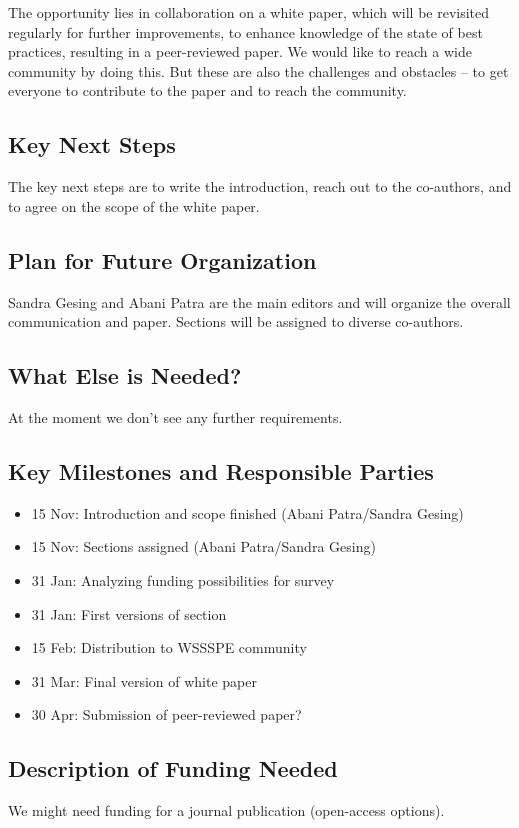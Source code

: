 The opportunity lies in collaboration on a white paper, which will be revisited
regularly for further improvements, to enhance knowledge of the state of best
practices, resulting in a peer-reviewed paper. We would like to reach a wide
community by doing this. But these are also the challenges and obstacles -- to
get everyone to contribute to the paper and to reach the community.

\subsection{Key Next Steps}

The key next steps are to write the introduction, reach out to the co-authors,
and to agree on the scope of the white paper.

\subsection{Plan for Future Organization}

Sandra Gesing and Abani Patra are the main editors and will organize the overall
communication and paper. Sections will be assigned to diverse co-authors.

\subsection{What Else is Needed?}

At the moment we don't see any further requirements.

\subsection{Key Milestones and Responsible Parties}
\begin{itemize}
\item 15 Nov: Introduction and scope finished (Abani Patra/Sandra Gesing)
\item 15 Nov: Sections assigned (Abani Patra/Sandra Gesing)
\item 31 Jan: Analyzing funding possibilities for survey
\item 31 Jan: First versions of section
\item 15 Feb: Distribution to WSSSPE community
\item 31 Mar: Final version of white paper
\item 30 Apr: Submission of peer-reviewed paper?
\end{itemize}

\subsection{Description of Funding Needed}
We might need funding for a journal publication (open-access options).
